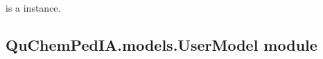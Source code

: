 \documentclass[letterpaper,10pt,english]{sphinxmanual}
\begin{document}
\begin{fulllineitems}
\begin{fulllineitems}
%
\begin{sphinxVerbatim}[commandchars=\\\{\}]
 
       
\end{sphinxVerbatim}

 is a  instance.

\end{fulllineitems}


\end{fulllineitems}



\subsection{QuChemPedIA.models.UserModel module}
\label{\detokenize{QuChemPedIA.models:module-QuChemPedIA.models.UserModel}}\label{\detokenize{QuChemPedIA.models:quchempedia-models-usermodel-module}}
\end{document}
